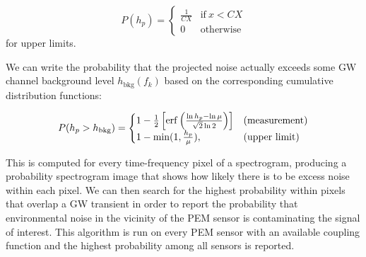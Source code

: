 \begin{equation}
	P(h_p) =
		\begin{cases}
      \frac{1}{CX} & \text{if}\ x < CX\\
      0 & \text{otherwise}
    \end{cases}
\end{equation}
for upper limits.

We can write the probability that the projected noise actually exceeds some \ac{GW} channel background level $h_{\text{bkg}}(f_k)$ based on the corresponding cumulative distribution functions:

\begin{equation}
	P(h_p > h_{\text{bkg}}) =
		\begin{cases}
			1 - \frac{1}{2} \left[ \erf \left( \frac{\ln h_p - \ln \mu}{\sqrt{2} \ln 2} \right) \right] & \text{(measurement)}\\
			1 - \min(1, \frac{h_p}{\mu}), & \text{(upper limit)}
		\end{cases}
\end{equation}

This is computed for every time-frequency pixel of a spectrogram, producing a probability spectrogram image that shows how likely there is to be excess noise within each pixel.
We can then search for the highest probability within pixels that overlap a \ac{GW} transient in order to report the probability that environmental noise in the vicinity of the \ac{PEM} sensor is contaminating the signal of interest.
This algorithm is run on every \ac{PEM} sensor with an available coupling function and the highest probability among all sensors is reported.

